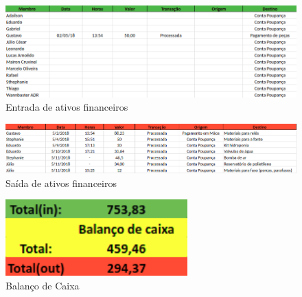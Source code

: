 \begin{figure}[H]
	\centering
	\includegraphics[width=17cm]{figuras/entrada_ativos_maio.png}
	\caption{Entrada de ativos financeiros} \label{entrada_ativos_maio}
\end{figure}

\begin{figure}[H]
	\centering
	\includegraphics[width=17cm]{figuras/saida_ativos_maio.png}
	\caption{Saída de ativos financeiros} \label{saida_ativos_maio}
\end{figure}

\begin{figure}[H]
	\centering
	\includegraphics[width=7cm]{figuras/balanco_maio.png}
	\caption{Balanço de Caixa} \label{balanco_maio}
\end{figure}